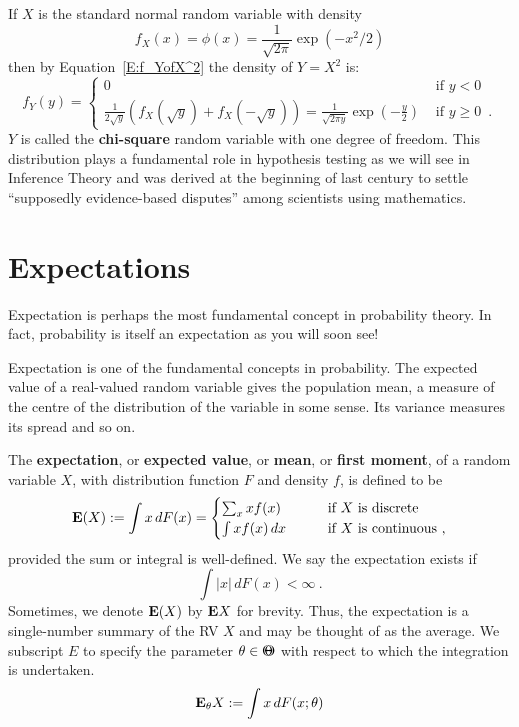 \begin{example}\label{Eg:SquaredStdNormalIsChiSquared}
{If $X$ is the standard normal random variable with density 
$$f_X(x) = \phi(x) = \frac{1}{\sqrt{2 \pi}} \exp{(-x^2/2)}$$ 
then by Equation~\eqref{E:f_YofX^2} the density of $Y=X^2$ is:
\[
f_Y(y) = 
\begin{cases}
0 
& \text{ if } y < 0 \\
\frac{1}{2 \sqrt{y}} \left( f_X(\sqrt{y}) + f_X( - \sqrt{y}) \right)
=
\frac{1}{\sqrt{2 \pi y}} \exp\left(-\frac{y}{2}\right) 
& \text{ if } y \geq 0 \enspace .
\end{cases}
\]
$Y$ is called the {\bf chi-square} random variable with one degree of freedom. This distribution plays a fundamental role in hypothesis testing as we will see in Inference Theory and was derived at the beginning of last century to settle ``supposedly evidence-based disputes'' among scientists using mathematics.
}
\end{example}
\newpage



\section{Expectations}\label{S:Expectations}

Expectation is perhaps the most fundamental concept in probability theory. In fact, probability is itself an expectation as you will soon see!

Expectation is one of the fundamental concepts in probability.  The
expected value of a real-valued random variable gives the population mean, a measure of the
centre of the distribution of the variable in some sense.  
Its variance measures its spread and so on.

\begin{definition}[Expectation of a RV]
The {\bf expectation}, or {\bf expected value}, or {\bf mean}, or {\bf first moment}, of a random variable $X$, with distribution function $F$ and density $f$, is defined to be
\begin{equation}\label{E:Mean}
\mathbf{E}(X) := \int x\,dF(x) = 
\begin{cases}
\sum_x x f(x) & \qquad \text{if $X$ is discrete} \\
\int x f(x)\,dx  & \qquad \text{if $X$ is continuous} \  ,
\end{cases}
\end{equation}
provided the sum or integral is well-defined.  We say the expectation exists if
\begin{equation}\label{E:ExpectationExists}
\int \left|x\right|\,dF(x) < \infty \ .
\end{equation}
Sometimes, we denote $\mathbf{E}(X)$ by $\mathbf{E} X$ for brevity.  Thus, the expectation is a single-number summary of the RV $X$ and may be thought of  as the average.
We subscript $E$ to specify the parameter $\theta \in {\Theta}\mspace{-11 mu}{\Theta}$ with respect to which the integration is undertaken. 
\[
\mathbf{E}_{\theta} X := \int x\,dF(x;\theta)
\]
\end{definition}

